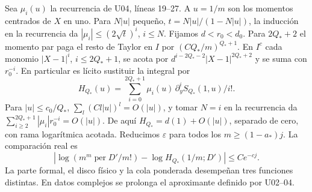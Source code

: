 Sea $\mu_i(u)$ la recurrencia de U04, líneas 19--27. A $u=1/m$ son los momentos
centrados de $X$ en uno. Para $N|u|$ pequeño, $t=N|u|/(1-N|u|)$,
la inducción en la recurrencia da $|\mu_i|\le(2\sqrt t)^i$, $i\le N$.
Fijamos $d<r_0<d_0$. Para $2Q_*+2$ el momento par paga el resto de Taylor en $I$
por $(CQ_*/m)^{Q_*+1}$. En $I^c$ cada monomio $|X-1|^i$, $i\le2Q_*+1$,
se acota por $d^{i-2Q_*-2}|X-1|^{2Q_*+2}$ y se suma con $r_0^{-i}$.
En particular es lícito sustituir la integral por
\[
 H_{Q_*}(u)=\sum_{i=0}^{2Q_*+1}\mu_i(u)\,\partial_y^i S_{Q_*}(1,u)/i!.
\]
Para $|u|\le c_0/Q_*$, $\sum_l(Cl|u|)^l=O(|u|)$, y tomar $N=i$
en la recurrencia da $\sum_{i\ge2}^{2Q_*+1}|\mu_i|r_0^{-i}=O(|u|)$.
De aquí $H_{Q_*}=d(1)+O(|u|)$, separado de cero, con rama logarítmica acotada.
Reducimos $\varepsilon$ para todos los $m\ge(1-a_*)j$. La comparación real es
\[
 \left|\log(m^m\operatorname{per}D'/m!)-\log H_{Q_*}(1/m;D')\right|\le Ce^{-cj}.
\]
La parte formal, el disco físico y la cola ponderada desempeñan tres funciones distintas.
En datos complejos se prolonga el aproximante definido por U02--04.
